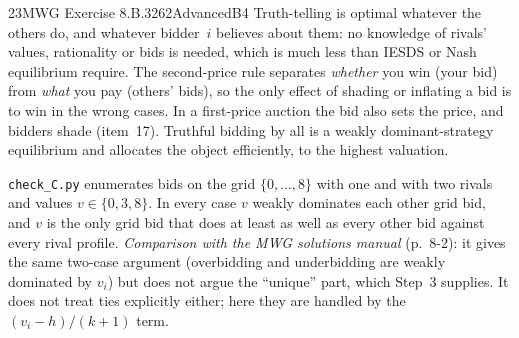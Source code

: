 \begin{exsol}{23}{MWG Exercise 8.B.3}{262}{Advanced}{B4}
\interp Truth-telling is optimal whatever the others do, and whatever bidder~$i$ believes about
them: no knowledge of rivals' values, rationality or bids is needed, which is much less than
IESDS or Nash equilibrium require. The second-price rule separates \emph{whether} you win (your
bid) from \emph{what} you pay (others' bids), so the only effect of shading or inflating a bid is
to win in the wrong cases. In a first-price auction the bid also sets the price, and bidders shade
(item~17). Truthful bidding by all is a weakly dominant-strategy equilibrium and allocates the
object efficiently, to the highest valuation.

\verify \texttt{check\_C.py} enumerates bids on the grid $\{0, \dots, 8\}$ with one and with two
rivals and values $v \in \{0, 3, 8\}$. In every case $v$ weakly dominates each other grid bid,
and $v$ is the only grid bid that does at least as well as every other bid against every rival
profile. \emph{Comparison with the MWG solutions manual} (p.~8-2): it gives the same two-case
argument (overbidding and underbidding are weakly dominated by $v_i$) but does not argue the
``unique'' part, which Step~3 supplies. It does not treat ties explicitly either; here
they are handled by the $(v_i - h)/(k+1)$ term.

\end{exsol}
